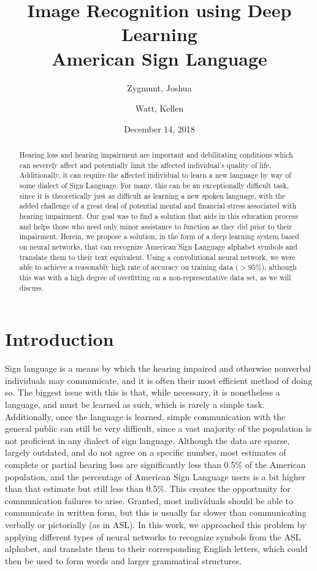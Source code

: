 \documentclass[10pt,Times New Roman]{article}
\title{Image Recognition using Deep Learning \\
       American Sign Language}
\author{Zygmunt, Joshua 
        \and
        Watt, Kellen}
\date{December 14, 2018}
\begin{document}
\maketitle
\begin{abstract}
    Hearing loss and hearing impairment are important and debilitating conditions which can
    severely affect and potentially limit the affected individual’s quality of life.
    Additionally, it can require the affected individual to learn a new language by way of
    some dialect of Sign Language. For many, this can be an exceptionally difficult task,
    since it is theoretically just as difficult as learning a new spoken language, with the
    added challenge of a great deal of potential mental and financial stress associated with
    hearing impairment. Our goal was to find a solution that aids in this education process 
    and helps those who need only minor assistance to function as they did prior to their
    impairment. Herein, we propose a solution, in the form of a deep learning system based
    on neural networks, that can recognize American Sign Language alphabet symbols and
    translate them to their text equivalent. Using a convolutional neural network, we were
    able to achieve a reasonably high rate of accuracy on training data ($>95\%$),
    although this was with a high degree of overfitting on a non-representative data set,
    as we will discuss.
\end{abstract}

\section{Introduction}
    Sign language is a means by which the hearing impaired and otherwise nonverbal individuals
    may communicate, and it is often their most efficient method of doing so. The biggest issue
    with this is that, while necessary, it is nonetheless a language, and must be learned as
    such, which is rarely a simple task. Additionally, once the language is learned, simple
    communication with the general public can still be very difficult, since a vast majority
    of the population is not proficient in any dialect of sign language. Although the data are
    sparse, largely outdated, and do not agree on a specific number, most estimates of complete
    or partial hearing loss are significantly less than 0.5\% of the American population, and
    the percentage of American Sign Language users is a bit higher than that estimate but still
    less than 0.5\%. This creates the opportunity for communication
    failures to arise. Granted, most individuals should be able to communicate in written form,
    but this is usually far slower than communicating verbally or pictorially (as in ASL).
    In this work, we approached this problem by applying different types of neural networks
    to recognize symbols from the ASL alphabet, and translate them to their corresponding
    English letters, which could then be used to form words and larger grammatical structures.
\end{document}
